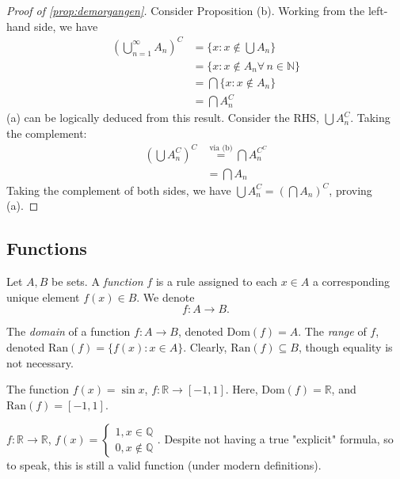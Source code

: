 \documentclass[12pt]{article}
\begin{document}
\begin{proof}[Proof of \cref{prop:demorgangen}]
  Consider Proposition (b). Working from the left-hand side, we have
  \begin{align*}
    \left(\bigcup_{n=1}^\infty A_n\right)^C &= \{x : x \notin \bigcup A_n\}\\
    &= \{x : x\notin A_n \forall\, n \in \mathbb{N}\}\\
    &= \bigcap \{x : x \notin A_n\}\\
    &= \bigcap A_n^C
  \end{align*}
  (a) can be logically deduced from this result. Consider the RHS, $\bigcup A_n^C$. Taking the complement:
  \begin{align*}
    \left(\bigcup A_n^C\right)^C &\overset{\text{via (b)}}{=} \bigcap A_n^{C^C}\\
    &= \bigcap A_n
  \end{align*}
  Taking the complement of both sides, we have $\bigcup A_n^C = \left(\bigcap A_n\right)^C$, proving (a). 
\end{proof}

\subsection{Functions}
\begin{definition}
  Let $A, B$ be sets. A \emph{function} $f$ is a rule assigned to each $x \in A$ a corresponding unique element $f(x) \in B$. We denote \[f: A \to B.\]
\end{definition}
\begin{definition}
  The \emph{domain} of a function $f: A \to B$, denoted $\text{Dom}(f) = A$. The \emph{range} of $f$, denoted $\text{Ran}(f) = \{f(x) : x \in A\}$. Clearly, $\text{Ran}(f) \subseteq B$, though equality is not necessary.
\end{definition}
\begin{example}
  The function $f(x) = \sin x$, $f: \mathbb{R} \to [-1, 1]$. Here, $\text{Dom}(f) = \mathbb{R}$, and $\text{Ran}(f) = [-1, 1]$.
\end{example}
\begin{example}
  $f:\mathbb{R} \to \mathbb{R}$, $f(x) = \begin{cases}
    1, x \in \mathbb{Q}\\
    0, x \notin \mathbb{Q}
  \end{cases}$. Despite not having a true "explicit" formula, so to speak, this is still a valid function (under modern definitions).
\end{example}
\end{document}
